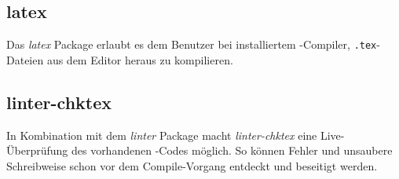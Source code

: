        \subsection{latex}
            Das \textit{latex} Package erlaubt es dem Benutzer bei installiertem \latex-Compiler, \texttt{.tex}-Dateien aus dem Editor heraus zu kompilieren.
        \subsection{linter-chktex}
            In Kombination mit dem \textit{linter} Package macht \textit{linter-chktex} eine Live-Überprüfung des vorhandenen \latex-Codes möglich. So können Fehler und unsaubere Schreibweise schon vor dem Compile-Vorgang entdeckt und beseitigt werden.
